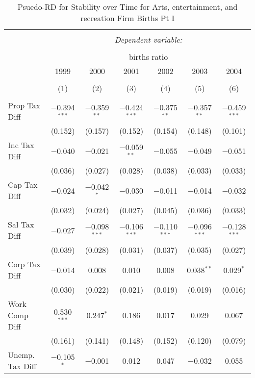 
\begin{table}[!htbp] \centering 
  \caption{Psuedo-RD for Stability over Time for  Arts, entertainment, and recreation Firm Births Pt I} 
  \label{71year} 
\small 
\begin{tabular}{@{\extracolsep{5pt}}lcccccc} 
\\[-1.8ex]\hline 
\hline \\[-1.8ex] 
 & \multicolumn{6}{c}{\textit{Dependent variable:}} \\ 
\cline{2-7} 
\\[-1.8ex] & \multicolumn{6}{c}{births ratio} \\ 
 & 1999 & 2000 & 2001 & 2002 & 2003 & 2004 \\ 
\\[-1.8ex] & (1) & (2) & (3) & (4) & (5) & (6)\\ 
\hline \\[-1.8ex] 
 Prop Tax Diff & $-$0.394$^{***}$ & $-$0.359$^{**}$ & $-$0.424$^{***}$ & $-$0.375$^{**}$ & $-$0.357$^{**}$ & $-$0.459$^{***}$ \\ 
  & (0.152) & (0.157) & (0.152) & (0.154) & (0.148) & (0.101) \\ 
  Inc Tax Diff & $-$0.040 & $-$0.021 & $-$0.059$^{**}$ & $-$0.055 & $-$0.049 & $-$0.051 \\ 
  & (0.036) & (0.027) & (0.028) & (0.038) & (0.033) & (0.033) \\ 
  Cap Tax Diff & $-$0.024 & $-$0.042$^{*}$ & $-$0.030 & $-$0.011 & $-$0.014 & $-$0.032 \\ 
  & (0.032) & (0.024) & (0.027) & (0.045) & (0.036) & (0.033) \\ 
  Sal Tax Diff & $-$0.027 & $-$0.098$^{***}$ & $-$0.106$^{***}$ & $-$0.110$^{***}$ & $-$0.096$^{***}$ & $-$0.128$^{***}$ \\ 
  & (0.039) & (0.028) & (0.031) & (0.037) & (0.035) & (0.027) \\ 
  Corp Tax Diff & $-$0.014 & 0.008 & 0.010 & 0.008 & 0.038$^{**}$ & 0.029$^{*}$ \\ 
  & (0.030) & (0.022) & (0.021) & (0.019) & (0.019) & (0.016) \\ 
  Work Comp Diff & 0.530$^{***}$ & 0.247$^{*}$ & 0.186 & 0.017 & 0.029 & 0.067 \\ 
  & (0.161) & (0.141) & (0.148) & (0.152) & (0.120) & (0.079) \\ 
  Unemp. Tax Diff & $-$0.105$^{*}$ & $-$0.001 & 0.012 & 0.047 & $-$0.032 & 0.055 \\ 

\end{tabular}
\end{table}
